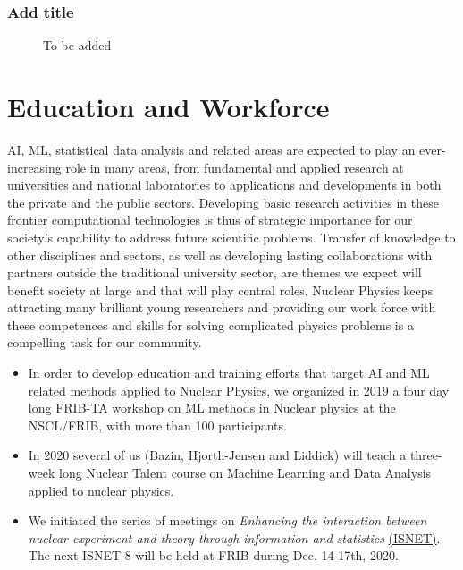 \documentclass[%
10pt]{article}
\begin{document}
\subsubsection{Add title}
\vspace{5mm}
\noindent
{}
\begin{figure}[htb!]
\centering
\caption{To be added}
\end{figure}
\clearpage
\newpage


\section{Education and Workforce}

AI, ML, statistical data analysis and related areas are expected to
play an ever-increasing role in many areas, from fundamental and
applied research at universities and national laboratories to
applications and developments in both the private and the public
sectors.
Developing basic research activities in these frontier
computational technologies is thus of strategic importance for our
society’s capability to address future scientific problems. Transfer
of knowledge to other disciplines and sectors, as well as developing
lasting collaborations with partners outside the traditional
university sector, are themes we expect will benefit society at large
and that will play central roles. Nuclear Physics keeps attracting many brilliant young researchers and providing our work force with these competences and skills for solving complicated physics problems is a compelling task for our community.


\begin{itemize}

\item In order to develop education and training efforts that target AI and ML related methods applied to Nuclear Physics, we  organized in 2019 a four day long  FRIB-TA workshop on ML methods in Nuclear physics at the NSCL/FRIB, with more than 100 participants.

\item In 2020 several of us (Bazin, Hjorth-Jensen and Liddick) will teach a three-week long Nuclear Talent course on Machine Learning and Data Analysis applied to nuclear physics. 

\item
We initiated the series of meetings on {\it Enhancing the interaction between nuclear experiment and theory through information and statistics} \href{https://iopscience.iop.org/journal/0954-3899/page/ISNET}{(ISNET)}.  The next ISNET-8 will be held at FRIB during  Dec. 14-17th, 2020.

\end{itemize}
\end{document}
